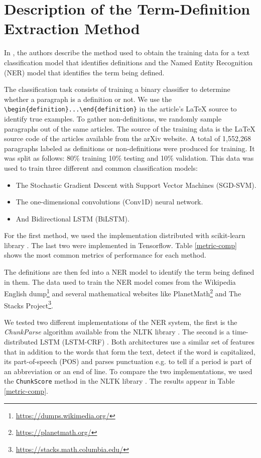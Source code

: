 \documentclass[submission,copyright,creativecommons]{eptcs}
\begin{document}
\section{Description of the Term-Definition Extraction Method}
In \cite{glossary, Deyan1}, the authors describe the 
method used  to obtain the training data for a text classification
model that identifies definitions and the Named Entity Recognition (NER) model that identifies the term being defined. 

The classification task consists of training a binary classifier to determine whether a paragraph is a definition or not. We use the \verb/\begin{definition}...\end{definition}/ in the article's \LaTeX{} source to identify true examples. To gather non-definitions, we randomly sample paragraphs out of the same articles.
The source of the training data is the \LaTeX{} source code of the articles available from the arXiv website. A total of 1,552,268 paragraphs labeled as definitions or non-definitions were produced for training. It was split as follows: 80\% training 10\% testing and 10\% validation. This data was used to train three different and common classification models:
\begin{itemize}
    \item The Stochastic Gradient Descent with Support Vector Machines (SGD-SVM). 
    \item The one-dimensional convolutions (Conv1D) neural network.
    \item And Bidirectional LSTM (BiLSTM). 
\end{itemize}
For the first method, we used the implementation distributed with scikit-learn library \cite{scikit-learn}. The last two were implemented in Tensorflow. Table \ref{metric-comp} shows the most common metrics of performance for each method. 

The definitions are then fed into a NER model to identify the term being defined in them.
The data used to train the NER model comes from the Wikipedia English dump\footnote{\url{https://dumps.wikimedia.org/}} and several mathematical websites like
PlanetMath\footnote{\url{https://planetmath.org/}} and The Stacks
Project\footnote{\url{https://stacks.math.columbia.edu/}}.

We tested two different implementations of the NER system, the first is the \emph{ChunkParse} algorithm available from the NLTK library \cite{bird2009natural}. The second is a time-distributed LSTM (LSTM-CRF) \cite{huang2015bidirectional}. Both architectures use a similar set of features that in addition to the words that form the text, detect if the word is capitalized, its part-of-speech (POS) and parses punctuation e.g. to tell if a period is part of an abbreviation or an end of line.
To compare the two implementations, we used the \texttt{ChunkScore} method in
the NLTK library \cite{bird2009natural}. The results appear in Table \ref{metric-comp}. 
\end{document}
